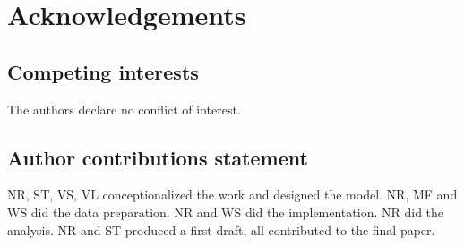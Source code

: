 \documentclass[fleqn,10pt]{wlscirep}
\begin{document}




\section*{Acknowledgements}

\subsection*{Competing interests}
The authors declare no conflict of interest.

\subsection*{Author contributions statement}
NR, ST, VS, VL conceptionalized the work and designed the model. NR, MF and WS did the data preparation. NR and WS did the implementation. NR did the analysis. NR and ST produced a first draft, all contributed to the final paper.
\end{document}
